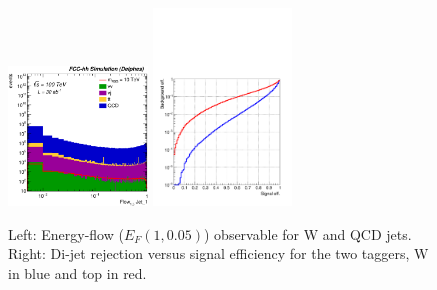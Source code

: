 \begin{figure}[!htbp]\centering
\includegraphics[width=0.33\textwidth]{Fig/TMVA/Jet1_Flow15_sel0_nostack_logx.eps}
\includegraphics[width=0.33\textwidth,trim={0 0.5cm 0 0},clip]{Fig/TMVA/effQCD_vs_effWhadBlue_thadRed_log.pdf}
\caption{Left: Energy-flow ($E_{F}(1,0.05)$) observable for W and QCD jets. Right: Di-jet rejection versus signal efficiency for the two taggers, W in blue and top in red.}
\label{fig:TMVA_final_result}
\end{figure}


